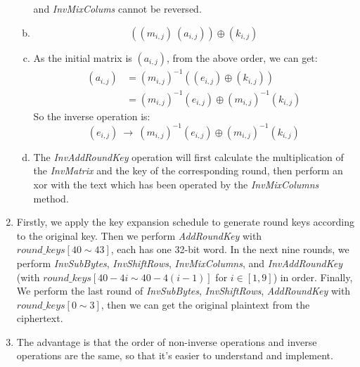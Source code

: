 \documentclass[12pt, a4paper]{article}
\begin{document}
\begin{enumerate}
\begin{enumerate}[a)]
                        and \emph{InvMixColums} cannot be reversed.
                  \item $$((m_{i,j})\ (a_{i,j})) \oplus (k_{i,j})$$
                  \item As the initial matrix is $(a_{i,j})$, from the above order, we can get:
                        \begin{align*}
                              (a_{i,j}) &= (m_{i,j})^{-1} ((e_{i,j}) \oplus (k_{i,j}))\\
                                        &= (m_{i,j})^{-1} (e_{i,j}) \oplus (m_{i,j})^{-1} (k_{i,j})
                        \end{align*}
                        So the inverse operation is:
                        $$(e_{i, j})\ \rightarrow \ (m_{i,j})^{-1} (e_{i,j}) \oplus (m_{i,j})^{-1} (k_{i,j})$$
                  \item The \emph{InvAddRoundKey} operation will first calculate the multiplication of the \emph{InvMatrix} 
                        and the key of the corresponding round, then perform an xor with the text which has been operated 
                        by the \emph{InvMixColumns} method.
            \end{enumerate}
      \item Firstly, we apply the key expansion schedule to generate round keys according to the original key. 
            Then we perform \emph{AddRoundKey} with $round\_keys[40 \sim 43]$, each has one 32-bit word.\newline
            In the next nine rounds, we perform \emph{InvSubBytes}, \emph{InvShiftRows}, \emph{InvMixColumns}, 
            and \emph{InvAddRoundKey} (with $round\_keys[40-4i \sim 40-4(i-1)]$ for $i \in [1, 9]$) in order.\newline
            Finally, We perform the last round of \emph{InvSubBytes}, \emph{InvShiftRows}, \emph{AddRoundKey} 
            with $round\_keys[0 \sim 3]$, then we can get the original plaintext from the ciphertext.
      \item The advantage is that the order of non-inverse operations and inverse operations are the same, 
            so that it's easier to understand and implement.
\end{enumerate}
\end{document}
